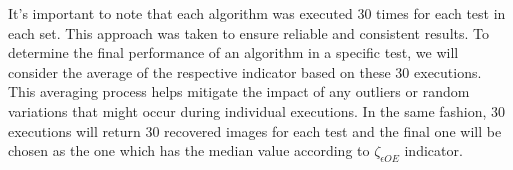 			It's important to note that each algorithm was executed 30 times for each test in each set. This approach was taken to ensure reliable and consistent results. To determine the final performance of an algorithm in a specific test, we will consider the average of the respective indicator based on these 30 executions. This averaging process helps mitigate the impact of any outliers or random variations that might occur during individual executions. In the same fashion, 30 executions will return 30 recovered images for each test and the final one will be chosen as the one which has the median value according to $\zeta_{\epsilon OE}$ indicator. 
		
			\begin{figure}
				\centering
				  \hspace{0.02\textwidth}
				 \\
				  \hspace{0.02\textwidth}
				 \\ 

\end{figure}
